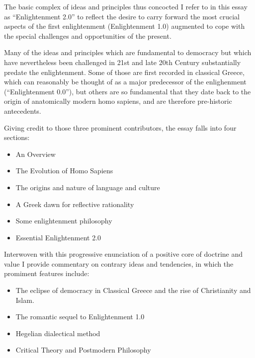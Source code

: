 \documentclass[10pt,titlepage]{book}
\begin{document}
The basic complex of ideas and principles thus concocted I refer to in this essay as ``Enlightenment 2.0'' to reflect the desire to carry forward the most crucial aspects of the first enlightenment (Enlightenment 1.0) augmented to cope with the special challenges and opportunities of the present.

Many of the ideas and principles which are fundamental to democracy but which have nevertheless been challenged in 21st and late 20th Century substantially predate the enlightenment.
Some of those are first recorded in classical Greece, which can reasonably be thought of as a major predecessor of the enlighenment (``Enlightenment 0.0''), but others are so fundamental that they date back to the origin of anatomically modern homo sapiens, and are therefore pre-historic antecedents.

Giving credit to those three prominent contributors, the essay falls into four sections:

\begin{itemize}
\item An Overview
\item The Evolution of Homo Sapiens
\item The origins and nature of language and culture
\item A Greek dawn for reflective rationality
\item Some enlightenment philosophy
\item Essential Enlightenment 2.0
\end{itemize}

Interwoven with this progressive enunciation of a positive core of doctrine and value I provide commentary on contrary ideas and tendencies, in which the promiment features include:

\begin{itemize}
\item The eclipse of democracy in Classical Greece and the rise of Christianity and Islam.
\item The romantic sequel to Enlightenment 1.0
\item Hegelian dialectical method
  \item Critical Theory and Postmodern Philosophy
\end{itemize}
\end{document}

